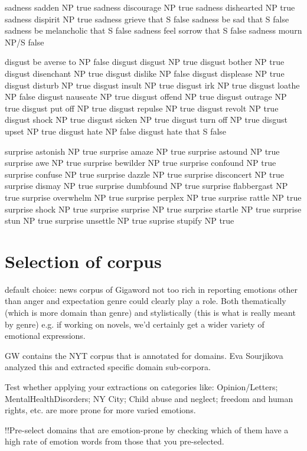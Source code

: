sadness	sadden	NP	true
sadness	discourage	NP	true
sadness	dishearted	NP	true
sadness	dispirit	NP	true
sadness	grieve that S	false
sadness	be sad that	S	false
sadness	be melancholic that	S	false
sadness	feel sorrow that	S	false
sadness	mourn	NP/S	false

disgust	be averse to	NP	false
disgust	disgust	NP	true
disgust	bother	NP	true
disgust	disenchant	NP	true
disgust	dislike	NP	false
disgust	displease	NP	true
disgust	disturb	NP	true
disgust	insult	NP	true
disgust	irk	NP	true
disgust	loathe	NP	false
disgust	nauseate	NP	true
disgust	offend	NP	true
disgust	outrage	NP	true
disgust	put off	NP	true
disgust	repulse	NP	true
disgust	revolt	NP	true
disgust	shock	NP	true
disgust	sicken	NP	true
disgust	turn off	NP	true
disgust	upset	NP	true
disgust	hate	NP	false
disgust	hate that	S	false

surprise	astonish	NP	true
surprise	amaze	NP	true
surprise	astound	NP	true
surprise	awe	NP	true
surprise	bewilder	NP	true
surprise	confound	NP	true
surprise	confuse	NP	true
surprise	dazzle	NP	true
surprise	disconcert	NP	true
surprise	dismay	NP	true
surprise	dumbfound	NP	true
surprise	flabbergast	NP	true
surprise	overwhelm	NP	true
surprise	perplex	NP	true
surprise	rattle	NP	true
surprise	shock	NP	true
surprise	surprise	NP	true
surprise	startle	NP	true
surprise	stun	NP	true
surprise	unsettle	NP	true
suprise	stupify	NP	true

\section{Selection of corpus}

default choice: news corpus of Gigaword
not too rich in reporting emotions other than anger and expectation
genre could clearly play a role.
Both thematically (which is more domain than genre) and stylistically (this is what is really meant by genre)
e.g. if working on novels, we'd certainly get a wider variety of emotional expressions.

GW contains the NYT corpus that is annotated for domains. 
Eva Sourjikova analyzed this and extracted specific domain sub-corpora. 

Test whether applying your extractions on categories like: Opinion/Letters; MentalHealthDisorders; NY City; Child abuse and neglect; freedom and human rights, etc. are more prone for more varied emotions.

!!Pre-select domains that are emotion-prone by checking which of them have a high rate of emotion words from those that you pre-selected.

